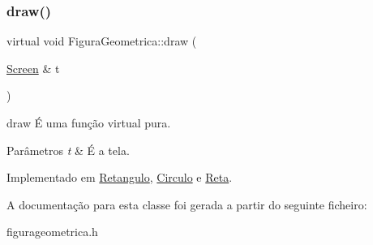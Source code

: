 \subsubsection{\texorpdfstring{draw()}{draw()}}
{\footnotesize\ttfamily virtual void Figura\+Geometrica\+::draw (\begin{DoxyParamCaption}\item[{\mbox{\hyperlink{class_screen}{Screen}} \&}]{t }\end{DoxyParamCaption})\hspace{0.3cm}{\ttfamily [pure virtual]}}



draw É uma função virtual pura. 


\begin{DoxyParams}{Parâmetros}
{\em t} & É a tela. \\
\hline
\end{DoxyParams}


Implementado em \mbox{\hyperlink{class_retangulo_ac088dd6d3f4f3d3f80363a868c2e74f1}{Retangulo}}, \mbox{\hyperlink{class_circulo_a593787d6e0618c2eded23e8839e7bea6}{Circulo}} e \mbox{\hyperlink{class_reta_ac2e9805183cd474b62bffd8b032cd780}{Reta}}.



A documentação para esta classe foi gerada a partir do seguinte ficheiro\+:\begin{DoxyCompactItemize}
\item 
figurageometrica.\+h\end{DoxyCompactItemize}
